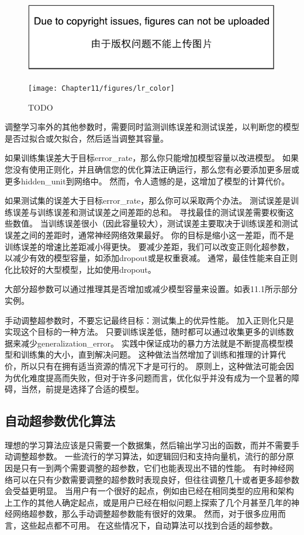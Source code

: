 \begin{figure}[!htb]
\ifOpenSource
\centerline{\includegraphics{figure.pdf}}
\else
\centerline{\texttt{[image: Chapter11/figures/lr\_color]}}
\fi
\caption{TODO}
\label{fig:chap11_lr}
\end{figure}

调整学习率外的其他参数时，需要同时监测训练误差和测试误差，以判断您的模型是否过拟合或欠拟合，然后适当调整其容量。

如果训练集误差大于目标\gls{error_rate}，那么你只能增加模型容量以改进模型。
如果您没有使用正则化，并且确信您的优化算法正确运行，那么您有必要添加更多层或更多\gls{hidden_unit}到网络中。
然而，令人遗憾的是，这增加了模型的计算代价。


如果测试集的误差大于目标\gls{error_rate}，那么你可以采取两个办法。
测试误差是训练误差与训练误差和测试误差之间差距的总和。
寻找最佳的测试误差需要权衡这些数值。
当训练误差很小（因此容量较大），测试误差主要取决于训练误差和测试误差之间的差距时，通常神经网络效果最好。
你的目标是缩小这一差距，而不是训练误差的增速比差距减小得更快。
要减少差距，我们可以改变正则化超参数，以减少有效的模型容量，如添加\gls{dropout}或是权重衰减。
通常，最佳性能来自正则化比较好的大型模型，比如使用\gls{dropout}。

大部分超参数可以通过推理其是否增加或减少模型容量来设置。如表11.1所示部分实例。

手动调整超参数时，不要忘记最终目标：测试集上的优异性能。
加入正则化只是实现这个目标的一种方法。
只要训练误差低，随时都可以通过收集更多的训练数据来减少\gls{generalization_error}。
实践中保证成功的暴力方法就是不断提高模型模型和训练集的大小，直到解决问题。
这种做法当然增加了训练和推理的计算代价，所以只有在拥有适当资源的情况下才是可行的。
原则上，这种做法可能会因为优化难度提高而失败，但对于许多问题而言，优化似乎并没有成为一个显著的障碍，当然，前提是选择了合适的模型。


\subsection{自动超参数优化算法}
\label{sec:automatic_hyperparameter_optimization_algorithms}
理想的学习算法应该是只需要一个数据集，然后输出学习出的函数，而并不需要手动调整超参数。
一些流行的学习算法，如逻辑回归和支持向量机，流行的部分原因是只有一到两个需要调整的超参数，它们也能表现出不错的性能。
有时神经网络可以在只有少数需要调整的超参数时表现良好，但往往调整几十或者更多超参数会受益更明显。
当用户有一个很好的起点，例如由已经在相同类型的应用和架构上工作的其他人确定起点，或是用户已经在相似问题上探索了几个月甚至几年的神经网络超参数，那么手动调整超参数能有很好的效果。
然而，对于很多应用而言，这些起点都不可用。
在这些情况下，自动算法可以找到合适的超参数。

